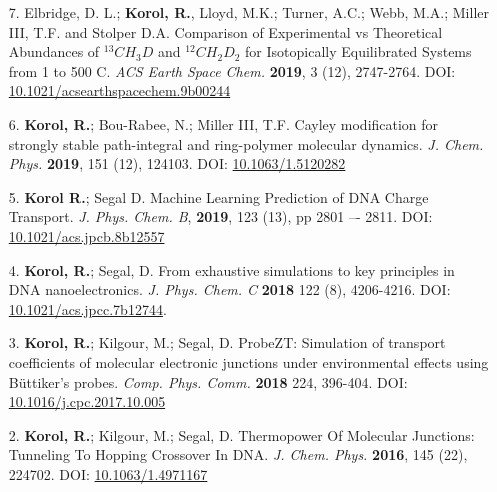 \documentclass[11pt]{res}
\begin{document}
\begin{resume}


\begin{enumerate}
	\item[7.] Elbridge, D. L.; \textbf{Korol, R.}, Lloyd, M.K.; Turner, A.C.; Webb, M.A.; Miller III, T.F. and Stolper D.A.
Comparison of Experimental vs Theoretical Abundances of $^{13}CH_3D$ and $^{12}CH_2D_2$ for Isotopically Equilibrated Systems from 1 to 500 \degree C. \textit{ACS Earth Space Chem.} \textbf{2019}, 3 (12), 2747-2764. DOI: \href{https://pubs.acs.org/doi/10.1021/acsearthspacechem.9b00244}{10.1021/acsearthspacechem.9b00244}


	\item[6.] \textbf{Korol, R.}; Bou-Rabee,  N.; Miller III, T.F. Cayley modification for strongly stable path-integral and ring-polymer molecular dynamics. \textit{J. Chem. Phys.} \textbf{2019}, 151 (12), 124103. DOI: \href{https://aip.scitation.org/doi/10.1063/1.5120282}{10.1063/1.5120282}

	\item[5.] \textbf{Korol R.}; Segal D. Machine Learning Prediction of DNA Charge Transport. \textit{J. Phys. Chem. B}, \textbf{2019}, 123 (13), pp 2801 –- 2811. DOI: \href{https://pubs.acs.org/doi/full/10.1021/acs.jpcb.8b12557}{10.1021/acs.jpcb.8b12557}
	
	\item[4.] \textbf{Korol, R.}; Segal, D. From exhaustive simulations to key principles in DNA nanoelectronics. \textit{J. Phys. Chem. C} \textbf{2018} 122 (8), 4206-4216. DOI: \href{https://pubs.acs.org/doi/abs/10.1021/acs.jpcc.7b12744}{10.1021/acs.jpcc.7b12744}.

	\item[3.] \textbf{Korol, R.}; Kilgour,  M.; Segal, D. ProbeZT: Simulation of transport coefficients of molecular electronic junctions under environmental effects using B\"uttiker’s probes. \textit{Comp. Phys. Comm.} \textbf{2018} 224, 396-404. DOI: \href{https://doi.org/10.1016/j.cpc.2017.10.005}{10.1016/j.cpc.2017.10.005}

	\item[2.] \textbf{Korol, R.}; Kilgour,  M.; Segal, D. Thermopower Of Molecular Junctions: Tunneling To Hopping Crossover In DNA. \textit{J. Chem. Phys.} \textbf{2016}, 145 (22), 224702. DOI: \href{http://aip.scitation.org/doi/abs/10.1063/1.4971167}{10.1063/1.4971167}


\end{enumerate}
\end{resume}
\end{document}
